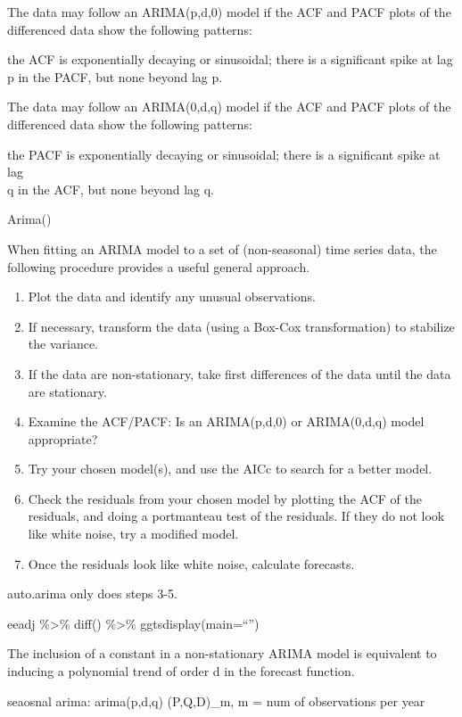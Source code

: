\documentclass[]{book}
\begin{document}
The data may follow an ARIMA(p,d,0) model if the ACF and PACF plots of
the differenced data show the following patterns:

the ACF is exponentially decaying or sinusoidal; there is a significant
spike at lag\\
p in the PACF, but none beyond lag p.

The data may follow an ARIMA(0,d,q) model if the ACF and PACF plots of
the differenced data show the following patterns:

the PACF is exponentially decaying or sinusoidal; there is a significant
spike at lag\\
q in the ACF, but none beyond lag q.

Arima()

When fitting an ARIMA model to a set of (non-seasonal) time series data,
the following procedure provides a useful general approach.

\begin{enumerate}
\def\labelenumi{\arabic{enumi}.}
\item
  Plot the data and identify any unusual observations.
\item
  If necessary, transform the data (using a Box-Cox transformation) to
  stabilize the variance.
\item
  If the data are non-stationary, take first differences of the data
  until the data are stationary.
\item
  Examine the ACF/PACF: Is an ARIMA(p,d,0) or ARIMA(0,d,q) model
  appropriate?
\item
  Try your chosen model(s), and use the AICc to search for a better
  model.
\item
  Check the residuals from your chosen model by plotting the ACF of the
  residuals, and doing a portmanteau test of the residuals. If they do
  not look like white noise, try a modified model.
\item
  Once the residuals look like white noise, calculate forecasts.
\end{enumerate}

auto.arima only does steps 3-5.

eeadj \%\textgreater{}\% diff() \%\textgreater{}\%
ggtsdisplay(main=``'')

The inclusion of a constant in a non-stationary ARIMA model is
equivalent to inducing a polynomial trend of order d in the forecast
function.

seaosnal arima: arima(p,d,q) (P,Q,D)\_m, m = num of observations per
year
\end{document}
